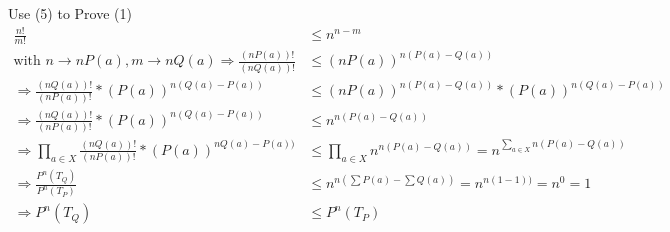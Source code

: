 \documentclass[
  course = {{EE623 Information Theory}},
  quartile = {{4}},
  assignment = 4,
  name = {{Mohammad Mahdi Rahimi}},
  studentnumber = {{20208244}},
  email = {{mahi@kaist.ac.kr}},
  firstexercise = 1
]{aga-homework}
\begin{document}
\subexercise Use (5) to Prove (1)\\
\begin{equation} \label{eq3}
\begin{split}
\frac{n!}{m!} & \le n^{n - m}\\
\text{with }n \rightarrow nP(a), m \rightarrow nQ(a)  \Rightarrow \frac{(nP(a))!}{(nQ(a))!} & \le (nP(a))^{n(P(a) - Q(a))}\\
\Rightarrow \frac{(nQ(a))!}{(nP(a))!} * (P(a))^{n(Q(a) - P(a))} & \le (nP(a))^{n(P(a) - Q(a))} * (P(a))^{n(Q(a) - P(a))}\\
\Rightarrow \frac{(nQ(a))!}{(nP(a))!} * (P(a))^{n(Q(a) - P(a))} & \le n^{n(P(a) - Q(a))}\\
\Rightarrow \prod_{a \in X}\frac{(nQ(a))!}{(nP(a))!} * (P(a))^{nQ(a) - P(a))} & \le  \prod_{a \in X}n^{n(P(a) - Q(a))} = n^{\sum_{a \in X} n(P(a) - Q(a))}\\
\Rightarrow \frac{P^n(T_Q)}{P^n(T_P)} & \le n^{n(\sum P(a) - \sum Q(a))} = n^{n(1 - 1))} = n^0 = 1 \\
\Rightarrow P^n(T_Q) & \le P^n(T_P)
\end{split}
\end{equation}
\end{document}
